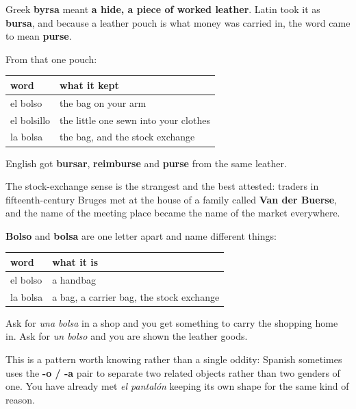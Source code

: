 \begin{cousinweb}
Greek \textbf{byrsa} meant \textbf{a hide, a piece of worked leather}. Latin took it as \textbf{bursa}, and because a leather pouch is what money was carried in, the word came to mean \textbf{purse}.

From that one pouch:

\noindent
\begin{tabularx}{\linewidth}{@{}>{\raggedright\arraybackslash}X>{\raggedright\arraybackslash}X@{}}
\toprule
\textbf{word} & \textbf{what it kept} \\
\midrule
el bolso & the bag on your arm \\
el bolsillo & the little one sewn into your clothes \\
la bolsa & the bag, and the stock exchange \\
\bottomrule
\end{tabularx}

English got \textbf{bursar}, \textbf{reimburse} and \textbf{purse} from the same leather.

The stock-exchange sense is the strangest and the best attested: traders in fifteenth-century Bruges met at the house of a family called \textbf{Van der Buerse}, and the name of the meeting place became the name of the market everywhere.
\end{cousinweb}

\begin{grammarlens}[title={Grammar Lens: the vowel that picks the object}]
\textbf{Bolso} and \textbf{bolsa} are one letter apart and name different things:

\noindent
\begin{tabularx}{\linewidth}{@{}>{\raggedright\arraybackslash}X>{\raggedright\arraybackslash}X@{}}
\toprule
\textbf{word} & \textbf{what it is} \\
\midrule
el bolso & a handbag \\
la bolsa & a bag, a carrier bag, the stock exchange \\
\bottomrule
\end{tabularx}

Ask for \emph{una bolsa} in a shop and you get something to carry the shopping home in. Ask for \emph{un bolso} and you are shown the leather goods.

This is a pattern worth knowing rather than a single oddity: Spanish sometimes uses the \textbf{-o / -a} pair to separate two related objects rather than two genders of one. You have already met \emph{el pantalón} keeping its own shape for the same kind of reason.
\end{grammarlens}

